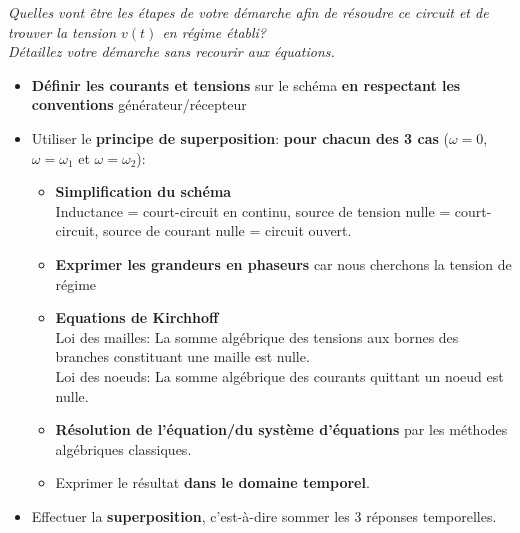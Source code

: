 \Question
{
\textit{Quelles vont être les étapes de votre démarche afin de résoudre ce circuit et de trouver la tension $v(t)$ en régime établi?\\
Détaillez votre démarche sans recourir aux équations. }
}
{
\begin{itemize}
	\item \textbf{Définir les courants et tensions} sur le schéma \textbf{en respectant les conventions} générateur/récepteur
	\item Utiliser le \textbf{principe de superposition}: \textbf{pour chacun des 3 cas} ($\omega=0$, $\omega=\omega_1$ et $\omega=\omega_2$):
	\begin{itemize}
		\item \textbf{Simplification du schéma}\\
			Inductance = court-circuit en continu, source de tension nulle = court-circuit, source de courant nulle = circuit ouvert.
		\item \textbf{Exprimer les grandeurs en phaseurs} car nous cherchons la tension de régime
		\item \textbf{Equations de Kirchhoff}\\
			Loi des mailles: La somme algébrique des tensions aux bornes des branches constituant une maille est nulle.\\
			Loi des noeuds: La somme algébrique des courants quittant un noeud est nulle.
		\item \textbf{Résolution de l'équation/du système d'équations} par les méthodes algébriques classiques.
		\item Exprimer le résultat \textbf{dans le domaine temporel}.
	\end{itemize}
	\item Effectuer la \textbf{superposition}, c'est-à-dire sommer les 3 réponses temporelles.
\end{itemize}
}


